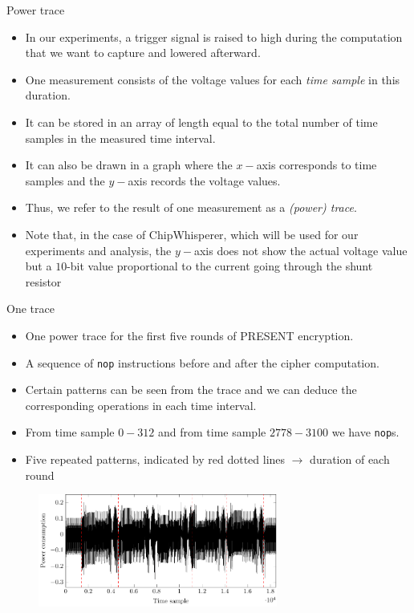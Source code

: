 \begin{frame}{Power trace}
    \begin{itemize}
        \item In our experiments, a trigger signal is raised to high during the computation that we want to capture and lowered afterward.
        \item One measurement consists of the voltage values for each \textit{time sample} in this duration.
        \item It can be stored in an array of length equal to the total number of time samples in the measured time interval.
       \item It can also be drawn in a graph where the $x-$axis corresponds to time samples and the $y-$axis records the voltage values.
       \item Thus, we refer to the result of one measurement as a \textit{(power) trace}.
       \item Note that, in the case of ChipWhisperer, which will be used for our experiments and analysis, the $y-$axis does not show the actual voltage value but a $10$-bit value proportional to the current going through the shunt resistor
    \end{itemize}
\end{frame}



\begin{frame}{One trace}
    \begin{itemize}
        \item One power trace for the first five rounds of PRESENT encryption.
        \item A sequence of \texttt{nop} instructions before and after the cipher computation.
        \item Certain patterns can be seen from the trace and we can deduce the corresponding operations in each time interval.
        \item From time sample $0-312$ and from time sample $2778-3100$ we have \texttt{nop}s.
        \item Five repeated patterns, indicated by red dotted lines $\rightarrow$ duration of each round
    \end{itemize}
    \begin{figure}
        \centering
\includegraphics[width=0.7\textwidth]{fig/present_5rounds.pdf}      
    \end{figure}
\end{frame}

